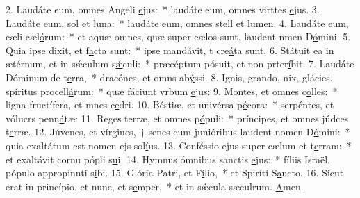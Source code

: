 2. Laudáte eum, omnes Angeli \uline{e}jus:~* laudáte eum, omnes virttes \uline{e}jus.
3. Laudáte eum, sol et l\uline{u}na:~* laudáte eum, omnes stell et l\uline{u}men.
4. Laudáte eum, cæli cæl\uline{ó}rum:~* et aquæ omnes, quæ super cælos sunt, laudent nmen D\uline{ó}mini.
5. Quia ipse dixit, et f\uline{a}cta sunt:~* ipse mandávit, t cre\uline{á}ta sunt.
6. Státuit ea in ætérnum, et in sǽculum s\uline{ǽ}culi:~* præcéptum pósuit, et non prter\uline{í}bit.
7. Laudáte Dóminum de t\uline{e}rra,~* dracónes, et omns ab\uline{ý}ssi.
8. Ignis, grando, nix, glácies, spíritus procell\uline{á}rum:~* quæ fáciunt vrbum \uline{e}jus:
9. Montes, et omnes c\uline{o}lles:~* ligna fructífera, et mnes c\uline{e}dri.
10. Béstiæ, et univérsa p\uline{é}cora:~* serpéntes, et vólucrs penn\uline{á}tæ:
11. Reges terræ, et omnes p\uline{ó}puli:~* príncipes, et omnes júdces t\uline{e}rræ.
12. Júvenes, et vírgines,~† senes cum junióribus laudent nomen D\uline{ó}mini:~* quia exaltátum est nomen ejs sol\uline{í}us.
13. Conféssio ejus super cælum et t\uline{e}rram:~* et exaltávit cornu pópli s\uline{u}i.
14. Hymnus ómnibus sanctis \uline{e}jus:~* fíliis Israël, pópulo appropinnti s\uline{i}bi.
15. Glória Patri, et F\uline{í}lio,~* et Spiríti S\uline{a}ncto.
16. Sicut erat in princípio, et nunc, et s\uline{e}mper,~* et in sǽcula sæculrum. \uline{A}men.
